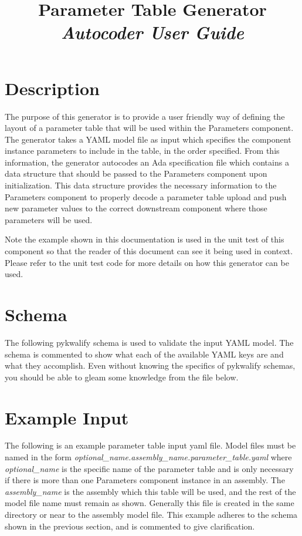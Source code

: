 



\title{\textbf{Parameter Table Generator} \\
\large\textit{Autocoder User Guide}}
\date{}
\maketitle

\section{Description}

The purpose of this generator is to provide a user friendly way of defining the layout of a parameter table that will be used within the Parameters component. The generator takes a YAML model file as input which specifies the component instance parameters to include in the table, in the order specified. From this information, the generator autocodes an Ada specification file which contains a data structure that should be passed to the Parameters component upon initialization. This data structure provides the necessary information to the Parameters component to properly decode a parameter table upload and push new parameter values to the correct downstream component where those parameters will be used.

Note the example shown in this documentation is used in the unit test of this component so that the reader of this document can see it being used in context. Please refer to the unit test code for more details on how this generator can be used.

\section{Schema}

The following pykwalify schema is used to validate the input YAML model. The schema is commented to show what each of the available YAML keys are and what they accomplish. Even without knowing the specifics of pykwalify schemas, you should be able to gleam some knowledge from the file below.


\section{Example Input}

The following is an example parameter table input yaml file. Model files must be named in the form \textit{optional\_name.assembly\_name.parameter\_table.yaml} where \textit{optional\_name} is the specific name of the parameter table and is only necessary if there is more than one Parameters component instance in an assembly. The \textit{assembly\_name} is the assembly which this table will be used, and the rest of the model file name must remain as shown. Generally this file is created in the same directory or near to the assembly model file. This example adheres to the schema shown in the previous section, and is commented to give clarification.

